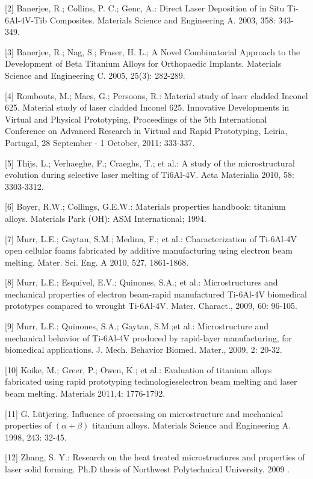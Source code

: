 \documentclass[10pt]{article}
\begin{document}
[2] Banerjee, R.; Collins, P. C.; Genc, A.: Direct Laser Deposition of in Situ Ti-6Al-4V-Tib Composites. Materials Science and Engineering A. 2003, 358: 343-349.

[3] Banerjee, R.; Nag, S.; Fraser, H. L.; A Novel Combinatorial Approach to the Development of Beta Titanium Alloys for Orthopaedic Implants. Materials Science and Engineering C. 2005, 25(3): 282-289.

[4] Rombouts, M.; Maes, G.; Persoons, R.: Material study of laser cladded Inconel 625. Material study of laser cladded Inconel 625. Innovative Developments in Virtual and Physical Prototyping, Proceedings of the 5th International Conference on Advanced Research in Virtual and Rapid Prototyping, Leiria, Portugal, 28 September - 1 October, 2011: 333-337.

[5] Thijs, L.; Verhaeghe, F.; Craeghs, T.; et al.: A study of the microstructural evolution during selective laser melting of Ti6Al-4V. Acta Materialia 2010, 58: 3303-3312.

[6] Boyer, R.W.; Collings, G.E.W.: Materials properties handbook: titanium alloys. Materials Park (OH): ASM International; 1994.

[7] Murr, L.E.; Gaytan, S.M.; Medina, F.; et al.: Characterization of Ti-6Al-4V open cellular foams fabricated by additive manufacturing using electron beam melting. Mater. Sci. Eng. A 2010, 527, 1861-1868.

[8] Murr, L.E.; Esquivel, E.V.; Quinones, S.A.; et al.: Microstructures and mechanical properties of electron beam-rapid manufactured Ti-6Al-4V biomedical prototypes compared to wrought Ti-6Al-4V. Mater. Charact., 2009, 60: 96-105.

[9] Murr, L.E.; Quinones, S.A.; Gaytan, S.M.;et al.: Microstructure and mechanical behavior of Ti-6Al-4V produced by rapid-layer manufacturing, for biomedical applications. J. Mech. Behavior Biomed. Mater., 2009, 2: 20-32.

[10] Koike, M.; Greer, P.; Owen, K.; et al.: Evaluation of titanium alloys fabricated using rapid prototyping technologieselectron beam melting and laser beam melting. Materials 2011,4: 1776-1792.

[11] G. Lütjering. Influence of processing on microstructure and mechanical properties of $(\alpha+\beta)$ titanium alloys. Materials Science and Engineering A. 1998, 243: 32-45.

[12] Zhang, S. Y.: Research on the heat treated microstructures and properties of laser solid forming. Ph.D thesis of Northwest Polytechnical University. 2009 .
\end{document}
